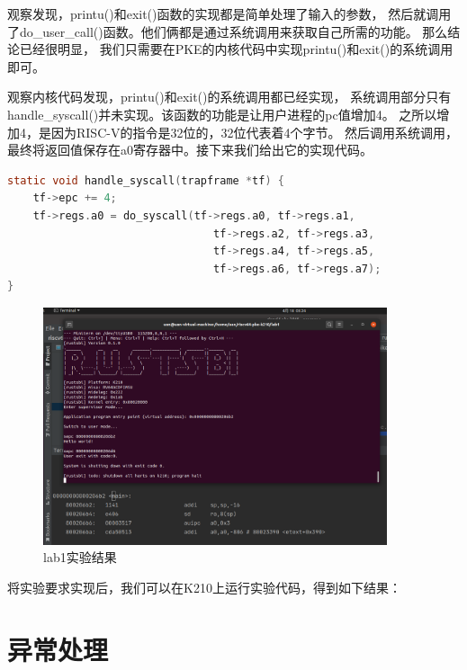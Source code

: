 观察发现，printu()和exit()函数的实现都是简单处理了输入的参数，
然后就调用了do\_user\_call()函数。他们俩都是通过系统调用来获取自己所需的功能。
那么结论已经很明显，
我们只需要在PKE的内核代码中实现printu()和exit()的系统调用即可。

观察内核代码发现，printu()和exit()的系统调用都已经实现，
系统调用部分只有handle\_syscall()并未实现。该函数的功能是让用户进程的pc值增加4。
之所以增加4，是因为RISC-V的指令是32位的，32位代表着4个字节。
然后调用系统调用，最终将返回值保存在a0寄存器中。接下来我们给出它的实现代码。

\begin{lstlisting}[caption={handle\_syscall的实现}, label={lst:handle_syscall}, language=C]
static void handle_syscall(trapframe *tf) {
    tf->epc += 4;
    tf->regs.a0 = do_syscall(tf->regs.a0, tf->regs.a1,
                                tf->regs.a2, tf->regs.a3, 
                                tf->regs.a4, tf->regs.a5, 
                                tf->regs.a6, tf->regs.a7);
}
\end{lstlisting}

\begin{figure}[h]
    \vspace{13pt} %
    \centering
    \includegraphics[width=0.9\textwidth]{images/labs/lab1.png}
    \caption{lab1实验结果}\label{lab1实验结果} %
\end{figure}

将实验要求实现后，我们可以在K210上运行实验代码，得到如下结果：

\section{异常处理}

